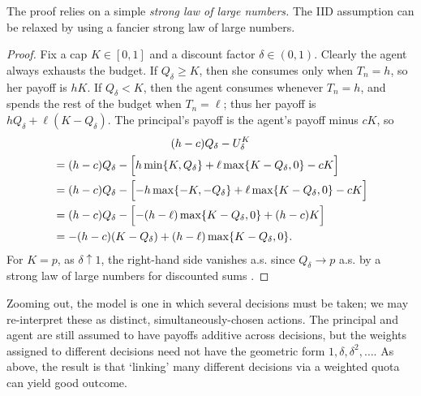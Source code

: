 The proof relies on a simple \emph{strong law of large numbers.}
The IID assumption can be relaxed by using a fancier strong law of large numbers.

\begin{proof}
	Fix a cap $K \in [0,1]$ and a discount factor $\delta \in (0,1)$.
	Clearly the agent always exhausts the budget.
	If $Q_\delta \geq K$, then she consumes only when $T_n=h$,
	so her payoff is $h K$.
	If $Q_\delta < K$, then the agent consumes whenever $T_n=h$,
	and spends the rest of the budget when $T_n=\ell$;
	thus her payoff is $h Q_\delta + \ell (K-Q_\delta)$.
	The principal's payoff is the agent's payoff minus $cK$, so
	\begin{multline*}
		(h-c) Q_\delta
		- U_\delta^K
		\\
		\begin{aligned}
			&= (h-c) Q_\delta
			- \Bigl[
			h \min\{K,Q_\delta\}
			+ \ell \max\{K-Q_\delta,0\}
			- c K 
			\Bigr]
			\\
			&= (h-c) Q_\delta
			- \Bigl[
			- h \max\{-K,-Q_\delta\}
			+ \ell \max\{K-Q_\delta,0\}
			- c K 
			\Bigr]
			\\
			&= (h-c) Q_\delta
			- \Bigl[
			- (h-\ell) \max\{K-Q_\delta,0\}
			+ (h-c)K
			\Bigr]
			\\
			&= - (h-c) ( K - Q_\delta )
			+ (h-\ell) \max\{K-Q_\delta,0\} .			
		\end{aligned}
	\end{multline*}
	For $K=p$,
	as $\delta \uparrow 1$,
	the right-hand side vanishes a.s.
	since $Q_\delta \to p$ a.s.
	by a strong law of large numbers for discounted sums \parencite[see][]{Lai1974}.
\end{proof}


\begin{remark}
	\label{remark:het}
	Zooming out, the model is one in which several decisions must be taken;
	we may re-interpret these as distinct, simultaneously-chosen actions.
	The principal and agent are still assumed to have payoffs additive across decisions, but the weights assigned to different decisions need not have the geometric form $1, \delta, \delta^2, \dots$.
	As above, the result is that `linking' many different decisions via a weighted quota can yield good outcome.
\end{remark}


